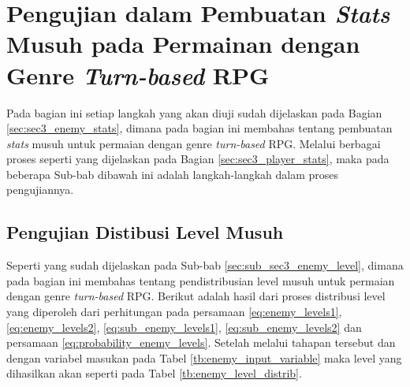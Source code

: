 \section{Pengujian dalam Pembuatan \textit{Stats} Musuh pada Permainan dengan Genre \textit{Turn-based} RPG}
\label{sec:sec4_eval_turn-based_enemy}
\vspace{1ex}

Pada bagian ini setiap langkah yang akan diuji sudah dijelaskan pada Bagian \ref{sec:sec3_enemy_stats}, dimana pada bagian ini membahas tentang pembuatan \textit{stats} musuh untuk permaian dengan genre \textit{turn-based} RPG. Melalui berbagai proses seperti yang dijelaskan pada Bagian \ref{sec:sec3_player_stats}, maka pada beberapa Sub-bab dibawah ini adalah langkah-langkah dalam proses pengujiannya.
\vspace{1ex}


\subsection{Pengujian Distibusi Level Musuh}
\label{sec:sub_sec4_eval_dist_enemy_level}
\vspace{1ex}

Seperti yang sudah dijelaskan pada Sub-bab \ref{sec:sub_sec3_enemy_level}, dimana pada bagian ini membahas tentang pendistribusian level musuh untuk permaian dengan genre \textit{turn-based} RPG. Berikut adalah hasil dari proses distribusi level yang diperoleh dari perhitungan pada persamaan \ref{eq:enemy_levels1}, \ref{eq:enemy_levels2}, \ref{eq:sub_enemy_levels1}, \ref{eq:sub_enemy_levels2} dan persamaan \ref{eq:probability_enemy_levels}. Setelah melalui tahapan tersebut dan dengan variabel masukan pada Tabel \ref{tb:enemy_input_variable} maka level yang dihasilkan akan seperti pada Tabel \ref{tb:enemy_level_distrib}.

